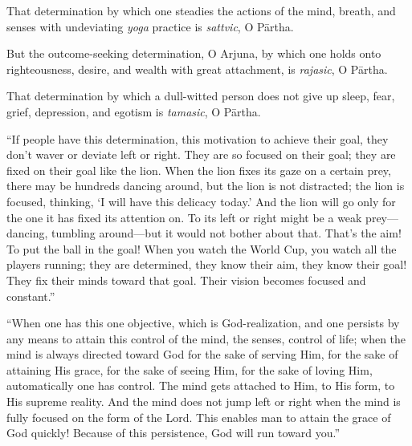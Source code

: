 {That determination by which one steadies the actions of the mind, breath, and senses with undeviating \textit{yoga} practice is \textit{sattvic}, O Pārtha.}


{But the outcome-seeking determination, O Arjuna, by which one holds onto righteousness, desire, and wealth with great attachment, is \textit{rajasic}, O Pārtha.}

{That determination by which a dull-witted person does not give up sleep, fear, grief, depression, and egotism is \textit{tamasic}, O Pārtha.}

\enquote{If people have this determination, this motivation to achieve their goal, they don’t waver or deviate left or right. They are so focused on their goal; they are fixed on their goal like the lion. When the lion fixes its gaze on a certain prey, there may be hundreds dancing around, but the lion is not distracted; the lion is focused, thinking, \enquote{I will have this delicacy today.} And the lion will go only for the one it has fixed its attention on. To its left or right might be a weak prey---dancing, tumbling around---but it would not bother about that. That’s the aim! To put the ball in the goal! When you watch the World Cup, you watch all the players running; they are determined, they know their aim, they know their goal! They fix their minds toward that goal. Their vision becomes focused and constant.}

\enquote{When one has this one objective, which is God-realization, and one persists by any means to attain this control of the mind, the senses, control of life; when the mind is always directed toward God for the sake of serving Him, for the sake of attaining His grace, for the sake of seeing Him, for the sake of loving Him, automatically one has control. The mind gets attached to Him, to His form, to His supreme reality. And the mind does not jump left or right when the mind is fully focused on the form of the Lord. This enables man to attain the grace of God quickly! Because of this persistence, God will run toward you.}

\newpage
